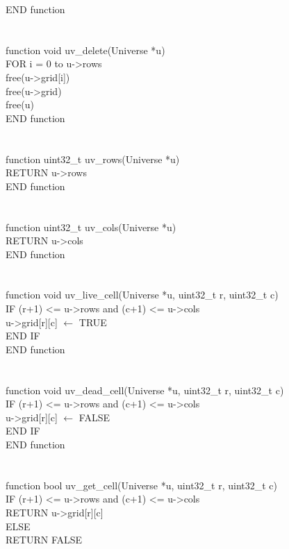 \documentclass[12pt]{article}
\begin{document}
END function \\
\\
\\
function void uv\_delete(Universe *u) \\
\indent FOR i = 0 to u->rows \\
\indent \indent free(u->grid[i]) \\
\indent free(u->grid) \\
\indent free(u) \\
END function \\
\\
\\
function uint32\_t uv\_rows(Universe *u) \\
\indent RETURN u->rows \\
END function \\
\\
\\
function uint32\_t uv\_cols(Universe *u) \\
\indent RETURN u->cols \\
END function \\
\\
\\
function void uv\_live\_cell(Universe *u, uint32\_t r, uint32\_t c) \\
\indent IF (r+1) <= u->rows and (c+1) <= u->cols \\
\indent \indent u->grid[r][c] $\leftarrow$ TRUE \\
\indent END IF \\
END function \\
\\
\\
function void uv\_dead\_cell(Universe *u, uint32\_t r, uint32\_t c) \\
\indent IF (r+1) <= u->rows and (c+1) <= u->cols \\
\indent \indent u->grid[r][c] $\leftarrow$ FALSE \\
\indent END IF \\
END function \\
\\
\\
function bool uv\_get\_cell(Universe *u, uint32\_t r, uint32\_t c) \\
\indent IF (r+1) <= u->rows and (c+1) <= u->cols \\
\indent \indent RETURN u->grid[r][c] \\
\indent ELSE \\
\indent \indent RETURN FALSE \\
\end{document}
